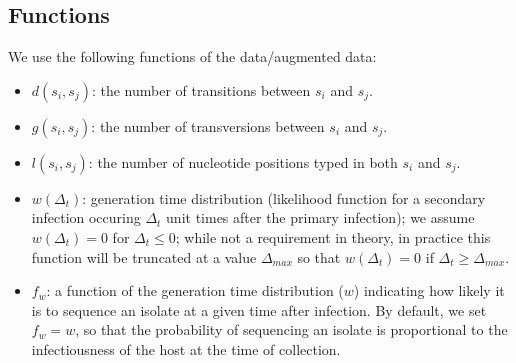 \documentclass[10pt]{article}
\begin{document}



\subsection*{Functions}
We use the following functions of the data/augmented data:
\begin{itemize}
  \item $d(s_i,s_j)$: the number of transitions between $s_i$ and $s_j$.
  \item $g(s_i,s_j)$: the number of transversions between $s_i$ and $s_j$.
  \item $l(s_i,s_j)$: the number of nucleotide positions typed in both $s_i$ and $s_j$.
  \item $w(\Delta_t)$: generation time distribution (likelihood function for a secondary infection occuring $\Delta_t$ unit times after the primary infection); we assume $w(\Delta_t)=0$ for $\Delta_t \leq 0$; while not a requirement in theory, in practice this function will be truncated at a value $\Delta_{max}$ so that $w(\Delta_t)=0$ if $\Delta_t \geq \Delta_{max}$.
  \item $f_w$: a function of the generation time distribution ($w$) indicating how likely it is to sequence an isolate at a given time after infection. By default, we set $f_w=w$, so that the probability of sequencing an isolate is proportional to the infectiousness of the host at the time of collection.
\end{itemize}





\end{document}
